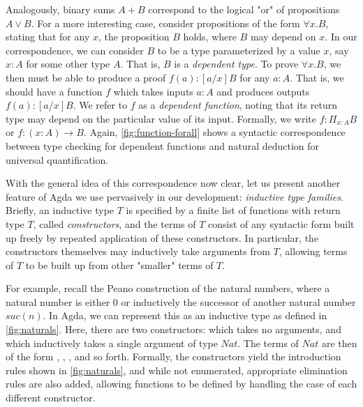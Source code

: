 

Analogously, binary sums $A + B$ correspond to the logical "or" of propositions $A \lor B$. For a more interesting case, consider propositions of the form $\forall x. B$, stating that for any $x$, the proposition $B$ holds, where $B$ may depend on $x$. In our correspondence, we can consider $B$ to be a type parameterized by a value $x$, say $x : A$ for some other type $A$. That is, $B$ is a \emph{dependent type}. To prove $\forall x. B$, we then must be able to produce a proof $f(a) : [a / x]B$ for any $a : A$. That is, we should have a function $f$ which takes inputs $a : A$ and produces outputs $f(a) : [a / x]B$. We refer to $f$ as a \emph{dependent function}, noting that its return type may depend on the particular value of its input. Formally, we write $f : \Pi_{x : A} B$ or $f : (x : A) \to B$. Again, \autoref{fig:function-forall} shows a syntactic correspondence between type checking for dependent functions and natural deduction for universal quantification. 



With the general idea of this correspondence now clear, let us present another feature of Agda we use pervasively in our development: \emph{inductive type families}. Briefly, an inductive type $T$ is specified by a finite list of functions with return type $T$, called \emph{constructors}, and the terms of $T$ consist of any syntactic form built up freely by repeated application of these constructors. In particular, the constructors themselves may inductively take arguments from $T$, allowing terms of $T$ to be built up from other "smaller" terms of $T$.

For example, recall the Peano construction of the natural numbers, where a natural number is either $0$ or inductively the successor of another natural number $suc(n)$. In Agda, we can represent this as an inductive type  as defined in \autoref{fig:naturals}. Here, there are two constructors:  which takes no arguments, and  which inductively takes a single argument of type $Nat$. The terms of $Nat$ are then of the form ,\; ,\; , and so forth. Formally, the constructors yield the introduction rules shown in \autoref{fig:naturals}, and while not enumerated, appropriate elimination rules are also added, allowing functions to be defined by handling the case of each different constructor.



